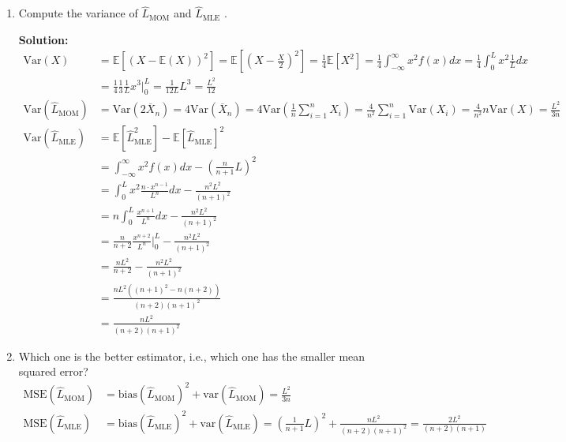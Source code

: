 \documentclass[letter, 12pt]{article}
\begin{document}
\begin{enumerate}[wide = 0pt, label = \arabic*)]
		\item {Compute the variance of $ \hat{L}_{\text{MOM}} $ and $ \hat{L}_{\text{MLE}} $ .}
		\par{\textbf{Solution:}}
		\begin{align*}
			\text{Var}({X}) &= \mathbb{E}[(X - \mathbb{E}(X))^2] = \mathbb{E}[(X - \frac{X}{2})^2] = \frac{1}{4} \mathbb{E}[X^2] = \frac{1}{4} \int_{-\infty}^{\infty} x^2 f(x) dx = \frac{1}{4} \int_{0}^{L} x^2 \frac{1}{L} dx \\
			&= \frac{1}{4} \frac{1}{3} \frac{1}{L} x^3 \Big|_0^L = \frac{1}{12 L} L^3 = \frac{L^2}{12}\\
			\text{Var}(\hat{L}_{\text{MOM}}) &= \text{Var}(2 \overline{X}_n) = 4 \text{Var}(\overline{X}_n) = 4 \text{Var}(\frac{1}{n}\sum_{i=1}^{n} {X}_i) = \frac{4}{n^2} \sum_{i=1}^{n} \text{Var}({X}_i) = \frac{4}{n^2} n \text{Var}({X}) = \frac{L^2}{3 n} \\
			\text{Var}(\hat{L}_{\text{MLE}}) &= \mathbb{E}[\hat{L}_{\text{MLE}}^2] - \mathbb{E}[\hat{L}_{\text{MLE}}]^2 \\
			&= \int_{-\infty}^{\infty} x^2 f(x) dx - (\frac{n}{n+1}L)^2 \\
			&= \int_{0}^{L} x^2 \frac{n \cdot x^{n-1}}{L^n} dx - \frac{n^2 L^2}{(n+1)^2} \\
			&= n \int_{0}^{L} \frac{x^{n+1}}{L^n} dx - \frac{n^2 L^2}{(n+1)^2} \\
			&= \frac{n}{n+2} \frac{x^{n+2}}{L^n} \Big|_{0}^L - \frac{n^2 L^2}{(n+1)^2} \\
			&= \frac{n L^2}{n+2} - \frac{n^2 L^2}{(n+1)^2} \\
			&= \frac{n L^2 ((n+1)^2 - n(n+2))}{(n+2)(n+1)^2} \\
			&= \frac{n L^2}{(n+2)(n+1)^2}
		\end{align*}
		
		\item {Which one is the better estimator, i.e., which one has the smaller mean squared error?}
		\begin{align*}
			\text{MSE}(\hat{L}_{\text{MOM}}) &= \text{bias}(\hat{L}_{\text{MOM}})^2 + \text{var}(\hat{L}_{\text{MOM}}) = \frac{L^2}{3 n} \\
			\text{MSE}(\hat{L}_{\text{MLE}}) &= \text{bias}(\hat{L}_{\text{MLE}})^2 + \text{var}(\hat{L}_{\text{MLE}}) = (\frac{1}{n+1} L)^2 + \frac{n L^2}{(n+2)(n+1)^2} = \frac{2 L^2}{(n+2)(n+1)} 
		\end{align*}
		

\end{enumerate}
\end{document}
